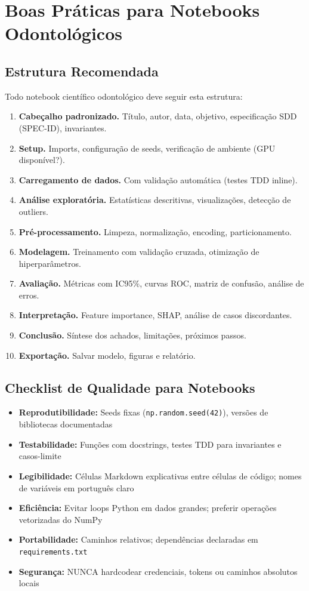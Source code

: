 \section{Boas Práticas para Notebooks Odontológicos}

\subsection{Estrutura Recomendada}

Todo notebook científico odontológico deve seguir esta estrutura:

\begin{enumerate}
    \item \textbf{Cabeçalho padronizado.} Título, autor, data, objetivo, especificação SDD (SPEC-ID), invariantes.
    \item \textbf{Setup.} Imports, configuração de seeds, verificação de ambiente (GPU disponível?).
    \item \textbf{Carregamento de dados.} Com validação automática (testes TDD inline).
    \item \textbf{Análise exploratória.} Estatísticas descritivas, visualizações, detecção de outliers.
    \item \textbf{Pré-processamento.} Limpeza, normalização, encoding, particionamento.
    \item \textbf{Modelagem.} Treinamento com validação cruzada, otimização de hiperparâmetros.
    \item \textbf{Avaliação.} Métricas com IC95\%, curvas ROC, matriz de confusão, análise de erros.
    \item \textbf{Interpretação.} Feature importance, SHAP, análise de casos discordantes.
    \item \textbf{Conclusão.} Síntese dos achados, limitações, próximos passos.
    \item \textbf{Exportação.} Salvar modelo, figuras e relatório.
\end{enumerate}

\subsection{Checklist de Qualidade para Notebooks}

\begin{itemize}
    \item \textbf{Reprodutibilidade:} Seeds fixas (\texttt{np.random.seed(42)}), versões de bibliotecas documentadas
    \item \textbf{Testabilidade:} Funções com docstrings, testes TDD para invariantes e casos-limite
    \item \textbf{Legibilidade:} Células Markdown explicativas entre células de código; nomes de variáveis em português claro
    \item \textbf{Eficiência:} Evitar loops Python em dados grandes; preferir operações vetorizadas do NumPy
    \item \textbf{Portabilidade:} Caminhos relativos; dependências declaradas em \texttt{requirements.txt}
    \item \textbf{Segurança:} NUNCA hardcodear credenciais, tokens ou caminhos absolutos locais
\end{itemize}

